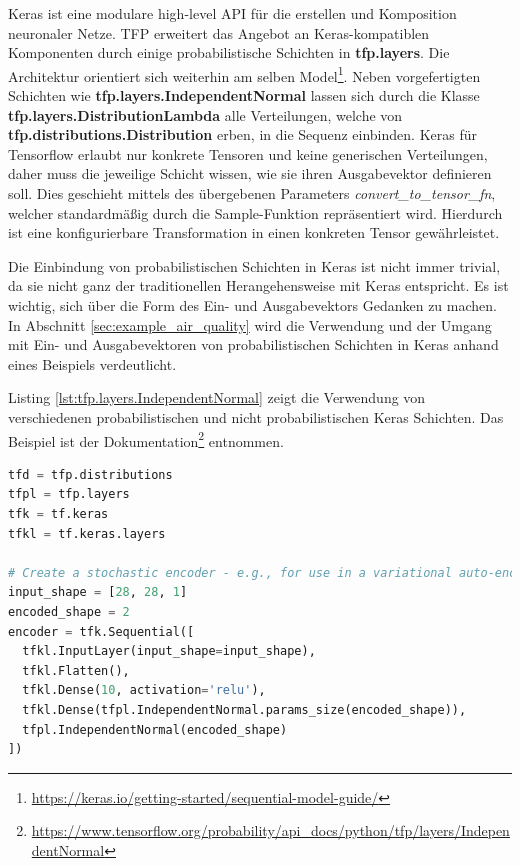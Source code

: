\documentclass[12pt]{article}
\begin{document}
Keras ist eine modulare high-level API für die erstellen und Komposition neuronaler Netze. TFP erweitert das Angebot an Keras-kompatiblen Komponenten durch einige probabilistische Schichten in \textbf{tfp.layers}. Die Architektur orientiert sich weiterhin am selben Model\footnote{\url{https://keras.io/getting-started/sequential-model-guide/}}. Neben vorgefertigten Schichten wie \textbf{tfp.layers.IndependentNormal} lassen sich durch die Klasse \textbf{tfp.layers.DistributionLambda} alle Verteilungen, welche von \textbf{tfp.distributions.Distribution} erben, in die Sequenz einbinden. Keras für Tensorflow erlaubt nur konkrete Tensoren und keine generischen Verteilungen, daher muss   die jeweilige Schicht wissen, wie sie ihren Ausgabevektor definieren soll. Dies geschieht mittels des übergebenen Parameters \textit{convert\_to\_tensor\_fn}, welcher standardmäßig durch die Sample-Funktion repräsentiert wird. Hierdurch ist eine konfigurierbare Transformation in einen konkreten Tensor gewährleistet.

Die Einbindung von probabilistischen Schichten in Keras ist nicht immer trivial, da sie nicht ganz der traditionellen Herangehensweise mit Keras entspricht. Es ist wichtig, sich über die Form des Ein- und Ausgabevektors Gedanken zu machen. In Abschnitt \ref{sec:example_air_quality} wird die Verwendung und der Umgang mit Ein- und Ausgabevektoren von probabilistischen Schichten in Keras anhand eines Beispiels verdeutlicht.


Listing \ref{lst:tfp.layers.IndependentNormal} zeigt die Verwendung von verschiedenen probabilistischen und nicht probabilistischen Keras Schichten. Das Beispiel ist der Dokumentation\footnote{\url{https://www.tensorflow.org/probability/api_docs/python/tfp/layers/IndependentNormal}} entnommen. 

\begin{lstlisting}[language=Python, caption={Beispiel probabilistischer und nicht probabilistischer Keras Schichten}, label={lst:tfp.layers.IndependentNormal}]
tfd = tfp.distributions
tfpl = tfp.layers
tfk = tf.keras
tfkl = tf.keras.layers

# Create a stochastic encoder - e.g., for use in a variational auto-encoder
input_shape = [28, 28, 1]
encoded_shape = 2
encoder = tfk.Sequential([
  tfkl.InputLayer(input_shape=input_shape),
  tfkl.Flatten(),
  tfkl.Dense(10, activation='relu'),
  tfkl.Dense(tfpl.IndependentNormal.params_size(encoded_shape)),
  tfpl.IndependentNormal(encoded_shape)
])
\end{lstlisting}
\end{document}
